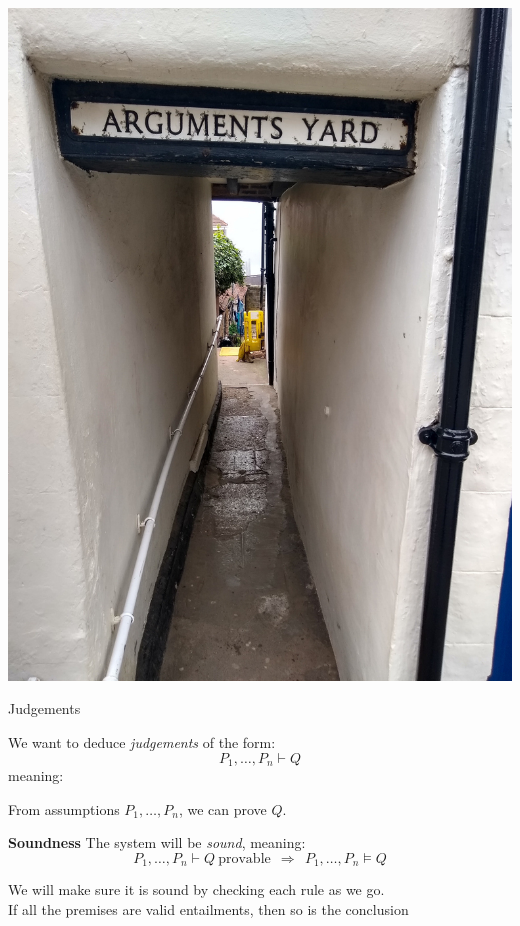 \documentclass[xetex,aspectratio=169,14pt,hyperref={pdfpagelabels=true,pdflang={en-GB}}]{beamer}
\begin{document}
\frame{\titlepage}

\begin{frame}
  \includegraphics[width=1.0\textwidth]{yard.jpg}
\end{frame}


\begin{frame}[t]
  {Judgements}

  We want to deduce \emph{judgements} of the form:
  \begin{displaymath}
    P_1, \dots, P_n \vdash Q
  \end{displaymath}
  meaning:
  \begin{center}
    From assumptions $P_1, \dots, P_n$, we can prove $Q$.
  \end{center}

  \bigskip

  {\bf Soundness}
  The system will be \emph{sound}, meaning:
  \begin{displaymath}
    P_1,\dots,P_n \vdash Q~\textrm{provable}~~\Rightarrow~~P_1, \dots, P_n \models Q
  \end{displaymath}

  We will make sure it is sound by checking each rule as we go. \\
  \quad \textcolor{black!60}{If all the premises are valid entailments, then so is the conclusion}
\end{frame}
\end{document}
